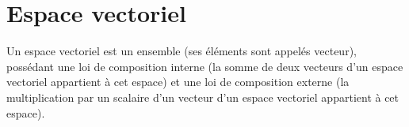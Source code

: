 
\chapter{Espace vectoriel}

Un espace vectoriel est un ensemble (ses éléments sont appelés vecteur), possédant une loi de composition interne (la somme de deux vecteurs d'un espace vectoriel appartient à cet espace) et une loi de composition externe (la multiplication par un scalaire d'un vecteur d'un espace vectoriel appartient à cet espace).


